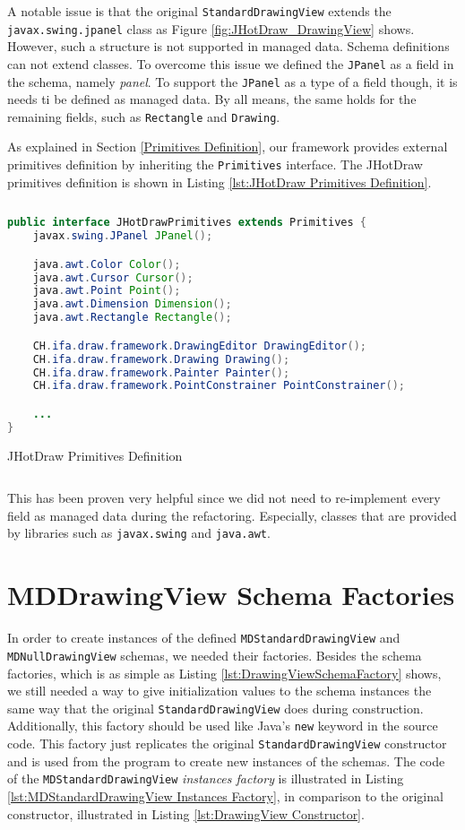 A notable issue is that the original \texttt{StandardDrawingView} extends the \texttt{javax.swing.jpanel} class as Figure \ref{fig:JHotDraw_DrawingView} shows.
However, such a structure is not supported in managed data. 
Schema definitions can not extend classes.
To overcome this issue we defined the \texttt{JPanel} as a field in the schema, namely \textit{panel}.
To support the \texttt{JPanel} as a type of a field though, it is needs ti be defined as managed data.
By all means, the same holds for the remaining fields, such as \texttt{Rectangle} and \texttt{Drawing}.

As explained in Section \ref{Primitives Definition}, our framework provides external primitives definition by inheriting the \texttt{Primitives} interface.
The JHotDraw primitives definition is shown in Listing \ref{lst:JHotDraw Primitives Definition}.

\begin{sourcecode}[H]
	\begin{lstlisting}[language=Java, escapechar=|]
public interface JHotDrawPrimitives extends Primitives {
	javax.swing.JPanel JPanel();

	java.awt.Color Color();
	java.awt.Cursor Cursor();
	java.awt.Point Point();
	java.awt.Dimension Dimension();
	java.awt.Rectangle Rectangle();

	CH.ifa.draw.framework.DrawingEditor DrawingEditor();
	CH.ifa.draw.framework.Drawing Drawing();
	CH.ifa.draw.framework.Painter Painter();
	CH.ifa.draw.framework.PointConstrainer PointConstrainer();

	...
}
	\end{lstlisting}
	\caption{JHotDraw Primitives Definition}
	\label{lst:JHotDraw Primitives Definition}
\end{sourcecode}

This has been proven very helpful since we did not need to re-implement every field as managed data during the refactoring. 
Especially, classes that are provided by libraries such as \texttt{javax.swing} and \texttt{java.awt}.

\section{MDDrawingView Schema Factories}
In order to create instances of the defined \texttt{MDStandardDrawingView} and \texttt{MDNullDrawingView} schemas, we needed their factories.
Besides the schema factories, which is as simple as Listing \ref{lst:DrawingViewSchemaFactory} shows, we still needed a way to give initialization values to the schema instances the same way that the original \texttt{StandardDrawingView} does during construction.
Additionally, this factory should be used like Java's \texttt{new} keyword in the source code.
This factory just replicates the original \texttt{StandardDrawingView} constructor and is used from the program to create new instances of the schemas.
The code of the \texttt{MDStandardDrawingView} \textit{instances factory} is illustrated in Listing \ref{lst:MDStandardDrawingView Instances Factory}, in comparison to the original constructor, illustrated in Listing \ref{lst:DrawingView Constructor}.

